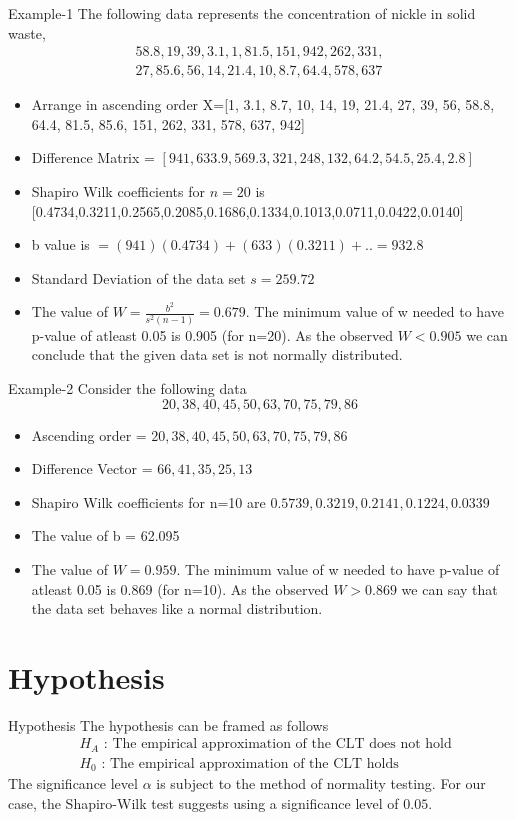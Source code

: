 \documentclass[10pt]{beamer}
\begin{document}
\begin{frame}{Example-1}
 The following data represents the concentration of nickle in solid waste,\begin{align*} 58.8,19,39,3.1,1,81.5,151,942,262,
    331,\\27,85.6,56,14,21.4,10,8.7,64.4,578,637 \end{align*}
    \begin{itemize}
        \item Arrange in ascending order X=[1, 3.1, 8.7, 10, 14, 19, 21.4, 27, 39, 56, 58.8, 64.4, 81.5, 85.6, 151, 262, 331, 578, 637, 942]
        \item Difference Matrix = $[ 941,633.9,569.3,321,248,132,64.2,54.5,25.4,2.8]$
        \item Shapiro Wilk coefficients for $n=20$ is [0.4734,0.3211,0.2565,0.2085,0.1686,0.1334,0.1013,0.0711,0.0422,0.0140]
        \item b value is $=(941)(0.4734)+(633)(0.3211)+.. = 932.8$
        \item Standard Deviation of the data set $s=259.72$
        \item The value of $W=\frac{b^{2}}{s^{2}(n-1)}=0.679$. The minimum value of w needed to have p-value of atleast 0.05 is 0.905 (for n=20). As the observed $W<0.905$ we can conclude that the given data set is not normally distributed.
    \end{itemize}
\end{frame}
\begin{frame}{Example-2}
Consider the following data
$$20,38,40,45,50,63,70,75,79,86$$
\begin{itemize}
    \item Ascending order = $20,38,40,45,50,63,70,75,79,86$
    \item Difference Vector = $66,41,35,25,13$
    \item Shapiro Wilk coefficients for n=10 are $0.5739,0.3219,0.2141,0.1224,0.0339$
    \item The value of b = 62.095
    \item The value of $W=0.959$. The minimum value of w needed to have p-value of atleast 0.05 is 0.869 (for n=10). As the observed $W>0.869$ we can say that the data set behaves like a normal distribution. 
\end{itemize}
\end{frame}
\section{Hypothesis}
\begin{frame}{Hypothesis}
    The hypothesis can be framed as follows
\begin{align}
    & H_A\text{ : The empirical approximation of the CLT does not hold} \nonumber\\
    & H_0\text{ : The empirical approximation of the CLT holds}\nonumber
\end{align}
The significance level $\alpha$ is subject to the method of normality testing. For our case, the Shapiro-Wilk test suggests using a significance level of $0.05$. 
\end{frame}
\end{document}
